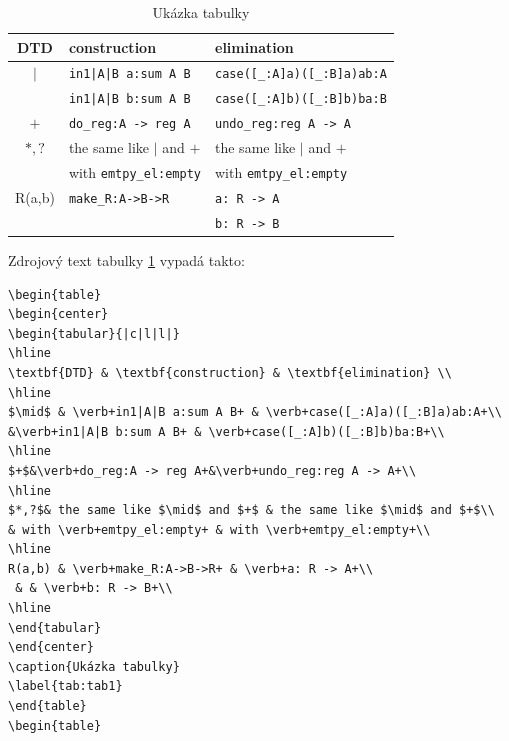 \documentclass[11pt,twoside,a4paper]{book}
\begin{document}
\begin{table}
\begin{center}
\begin{tabular}{|c|l|l|}
\hline
\textbf{DTD} & \textbf{construction} & \textbf{elimination} \\
\hline
$\mid$ & \verb+in1|A|B a:sum A B+ & \verb+case([_:A]a)([_:B]a)ab:A+\\
&\verb+in1|A|B b:sum A B+ & \verb+case([_:A]b)([_:B]b)ba:B+\\
\hline
$+$&\verb+do_reg:A -> reg A+&\verb+undo_reg:reg A -> A+\\
\hline
$*,?$& the same like $\mid$ and $+$ & the same like $\mid$ and $+$\\
& with \verb+emtpy_el:empty+ & with \verb+emtpy_el:empty+\\
\hline
R(a,b) & \verb+make_R:A->B->R+ & \verb+a: R -> A+\\
 & & \verb+b: R -> B+\\
\hline
\end{tabular}
\end{center}
\caption{Ukázka tabulky}
\label{tab:tab1}
\end{table}

Zdrojový text tabulky \ref{tab:tab1} vypadá takto:
\begin{verbatim}
\begin{table}
\begin{center}
\begin{tabular}{|c|l|l|}
\hline
\textbf{DTD} & \textbf{construction} & \textbf{elimination} \\
\hline
$\mid$ & \verb+in1|A|B a:sum A B+ & \verb+case([_:A]a)([_:B]a)ab:A+\\
&\verb+in1|A|B b:sum A B+ & \verb+case([_:A]b)([_:B]b)ba:B+\\
\hline
$+$&\verb+do_reg:A -> reg A+&\verb+undo_reg:reg A -> A+\\
\hline
$*,?$& the same like $\mid$ and $+$ & the same like $\mid$ and $+$\\
& with \verb+emtpy_el:empty+ & with \verb+emtpy_el:empty+\\
\hline
R(a,b) & \verb+make_R:A->B->R+ & \verb+a: R -> A+\\
 & & \verb+b: R -> B+\\
\hline
\end{tabular}
\end{center}
\caption{Ukázka tabulky}
\label{tab:tab1}
\end{table}
\begin{table}
\end{verbatim}
\end{document}
